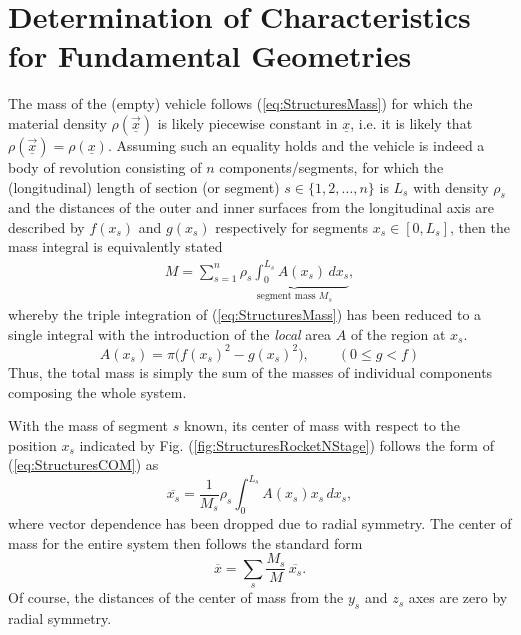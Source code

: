 \documentclass[11pt,dvipsnames]{thesis}
\begin{document}
\section{Determination of Characteristics for Fundamental Geometries}
The mass of the (empty) vehicle follows (\ref{eq:StructuresMass}) for which the material density $\rho(\vec{\underline{x}})$ is likely piecewise constant in $\underline{x}$, i.e. it is likely that $\rho(\vec{\underline{x}}) = \rho(\underline{x})$. Assuming such an equality holds and the vehicle is indeed a body of revolution consisting of $n$ components/segments, for which the (longitudinal) length of section (or segment) $s \in \{1, 2, \ldots, n\}$ is $L_s$ with density $\rho_s$ and the distances of the outer and inner surfaces from the longitudinal axis are described by $f(x_s)$ and $g(x_s)$ respectively for segments $x_s \in [0, L_s]$, then the mass integral is equivalently stated
\begin{align}
M = \sum_{s = 1}^n \underbrace{\rho_s \int_0^{L_s} A(x_s) \,dx_s}_{\text{segment mass }M_s},  \label{eq:StructuresMassAndSegmentMass}
\end{align}
whereby the triple integration of (\ref{eq:StructuresMass}) has been reduced to a single integral with the introduction of the \textit{local} area $A$ of the region at $x_s$.
\begin{equation}
A(x_s) = \pi \big(f(x_s)^2 - g(x_s)^2\big), \qquad (0 \leqslant g < f)
\end{equation}
Thus, the total mass is simply the sum of the masses of individual components composing the whole system.

With the mass of segment $s$ known, its center of mass with respect to the position $x_s$ indicated by Fig. (\ref{fig:StructuresRocketNStage}) follows the form of (\ref{eq:StructuresCOM}) as
\begin{equation}
\overline{x_s} = \frac{1}{M_s} %
\rho_s\int_0^{L_s} A(x_s) x_s \,dx_s,
\end{equation}
where vector dependence has been dropped due to radial symmetry. The center of mass for the entire system then follows the standard form
\begin{equation}
\overline{x} = \sum_s \frac{M_s}{M}\,\overline{x_s}.
\end{equation}
Of course, the distances of the center of mass from the $y_s$ and $z_s$ axes are zero by radial symmetry.
\end{document}
